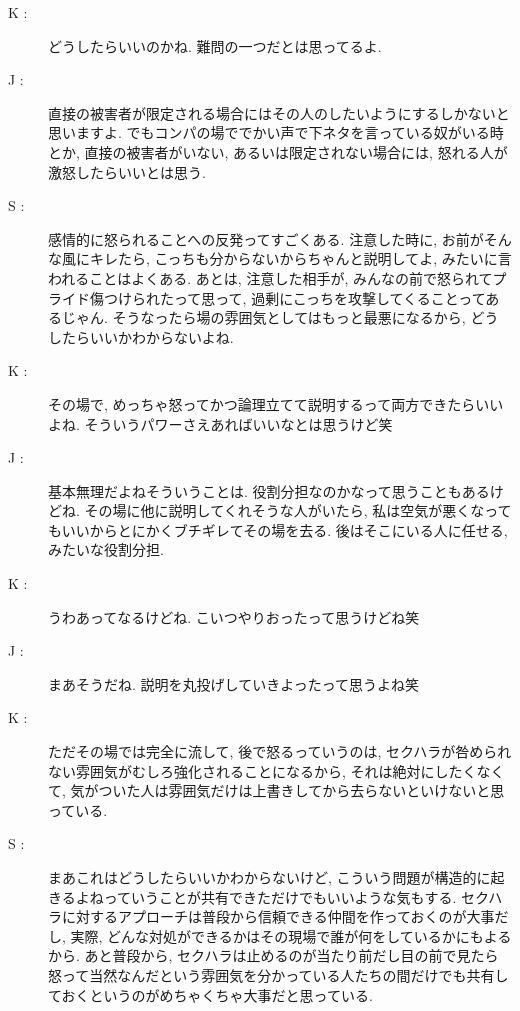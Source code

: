 \documentclass[10pt,b5jsbook,dvips,dvipdfmx,openany]{jsbook}
\theoremstyle{definition}
\begin{document}
\begin{multicols}{2}
\begin{description}
		\item[ K : ] どうしたらいいのかね. 難問の一つだとは思ってるよ. 

		\item[ J : ] 直接の被害者が限定される場合にはその人のしたいようにするしかないと思いますよ. でもコンパの場ででかい声で下ネタを言っている奴がいる時とか, 直接の被害者がいない, あるいは限定されない場合には, 怒れる人が激怒したらいいとは思う. 

		\item[ S : ] 感情的に怒られることへの反発ってすごくある. 注意した時に, お前がそんな風にキレたら, こっちも分からないからちゃんと説明してよ, みたいに言われることはよくある. あとは, 注意した相手が, みんなの前で怒られてプライド傷つけられたって思って, 過剰にこっちを攻撃してくることってあるじゃん. そうなったら場の雰囲気としてはもっと最悪になるから, どうしたらいいかわからないよね. 

		\item[ K : ] その場で, めっちゃ怒ってかつ論理立てて説明するって両方できたらいいよね. そういうパワーさえあればいいなとは思うけど笑

		\item[ J : ] 基本無理だよねそういうことは. 役割分担なのかなって思うこともあるけどね. その場に他に説明してくれそうな人がいたら, 私は空気が悪くなってもいいからとにかくブチギレてその場を去る. 後はそこにいる人に任せる, みたいな役割分担. 

		\item[ K : ] うわあってなるけどね. こいつやりおったって思うけどね笑

		\item[ J : ] まあそうだね. 説明を丸投げしていきよったって思うよね笑

		\item[ K : ] ただその場では完全に流して, 後で怒るっていうのは, セクハラが咎められない雰囲気がむしろ強化されることになるから, それは絶対にしたくなくて, 気がついた人は雰囲気だけは上書きしてから去らないといけないと思っている. 

		\item[ S : ] まあこれはどうしたらいいかわからないけど, こういう問題が構造的に起きるよねっていうことが共有できただけでもいいような気もする. セクハラに対するアプローチは普段から信頼できる仲間を作っておくのが大事だし, 実際, どんな対処ができるかはその現場で誰が何をしているかにもよるから. あと普段から, セクハラは止めるのが当たり前だし目の前で見たら怒って当然なんだという雰囲気を分かっている人たちの間だけでも共有しておくというのがめちゃくちゃ大事だと思っている. 


\end{description}
\end{multicols}
\end{document}
